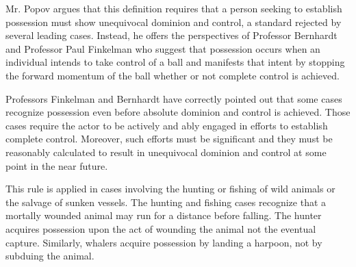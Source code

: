 Mr. Popov argues that this definition requires that a person seeking to
establish possession must show unequivocal dominion and control, a standard
rejected by several leading cases. Instead, he offers the perspectives of Professor
Bernhardt and Professor Paul Finkelman who suggest that possession occurs when
an individual intends to take control of a ball and manifests that intent by
stopping the forward momentum of the ball whether or not complete control is
achieved.

Professors Finkelman and Bernhardt have correctly pointed out that some cases
recognize possession even before absolute dominion and control is achieved.
Those cases require the actor to be actively and ably engaged in efforts to
establish complete control. Moreover, such efforts must be significant and they must be reasonably
calculated to result in unequivocal dominion and control at some point in the
near future. 

This rule is applied in cases involving the hunting or fishing of wild
animals or the salvage of
sunken vessels. The hunting and fishing cases recognize that a mortally wounded
animal may run for a distance before falling. The hunter acquires possession
upon the act of wounding the animal not the eventual capture. Similarly, whalers
acquire possession by landing a harpoon, not by subduing the animal. 

